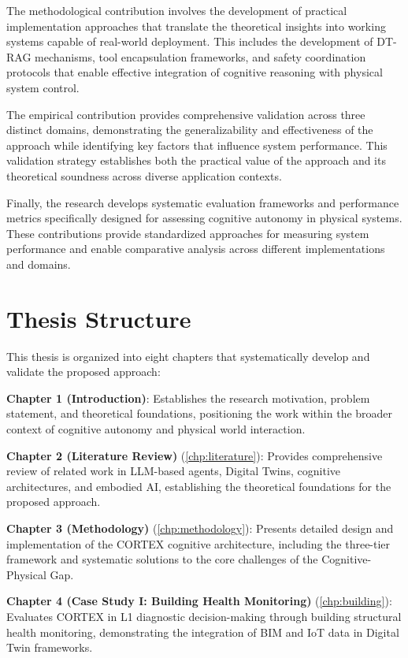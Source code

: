 The methodological contribution involves the development of practical implementation approaches that translate the theoretical insights into working systems capable of real-world deployment. This includes the development of DT-RAG mechanisms, tool encapsulation frameworks, and safety coordination protocols that enable effective integration of cognitive reasoning with physical system control.

The empirical contribution provides comprehensive validation across three distinct domains, demonstrating the generalizability and effectiveness of the approach while identifying key factors that influence system performance. This validation strategy establishes both the practical value of the approach and its theoretical soundness across diverse application contexts.

Finally, the research develops systematic evaluation frameworks and performance metrics specifically designed for assessing cognitive autonomy in physical systems. These contributions provide standardized approaches for measuring system performance and enable comparative analysis across different implementations and domains.

\section{Thesis Structure}

This thesis is organized into eight chapters that systematically develop and validate the proposed approach:

\textbf{Chapter 1 (Introduction)}: Establishes the research motivation, problem statement, and theoretical foundations, positioning the work within the broader context of cognitive autonomy and physical world interaction.

\textbf{Chapter 2 (Literature Review)} (\autoref{chp:literature}): Provides comprehensive review of related work in LLM-based agents, Digital Twins, cognitive architectures, and embodied AI, establishing the theoretical foundations for the proposed approach.

\textbf{Chapter 3 (Methodology)} (\autoref{chp:methodology}): Presents detailed design and implementation of the CORTEX cognitive architecture, including the three-tier framework and systematic solutions to the core challenges of the Cognitive-Physical Gap.

\textbf{Chapter 4 (Case Study I: Building Health Monitoring)} (\autoref{chp:building}): Evaluates CORTEX in L1 diagnostic decision-making through building structural health monitoring, demonstrating the integration of BIM and IoT data in Digital Twin frameworks.

